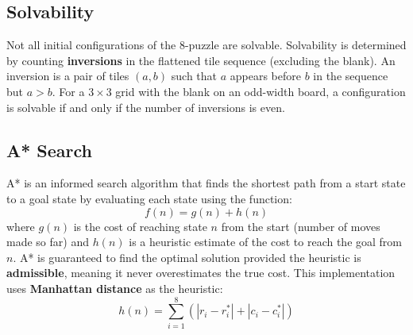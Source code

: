 \documentclass[12pt,a4paper]{report}
\begin{document}
\subsection{Solvability}
Not all initial configurations of the 8-puzzle are solvable. Solvability is
determined by counting \textbf{inversions} in the flattened tile sequence
(excluding the blank). An inversion is a pair of tiles $(a, b)$ such that $a$
appears before $b$ in the sequence but $a > b$. For a $3 \times 3$ grid with
the blank on an odd-width board, a configuration is solvable if and only if the
number of inversions is even.

\subsection{A* Search}
A* is an informed search algorithm that finds the shortest path from a start
state to a goal state by evaluating each state using the function:
\[
f(n) = g(n) + h(n)
\]
where $g(n)$ is the cost of reaching state $n$ from the start (number of moves
made so far) and $h(n)$ is a heuristic estimate of the cost to reach the goal
from $n$. A* is guaranteed to find the optimal solution provided the heuristic
is \textbf{admissible}, meaning it never overestimates the true cost. This
implementation uses \textbf{Manhattan distance} as the heuristic:
\[
h(n) = \sum_{i=1}^{8} \left( |r_i - r_i^*| + |c_i - c_i^*| \right)
\]

\end{document}
